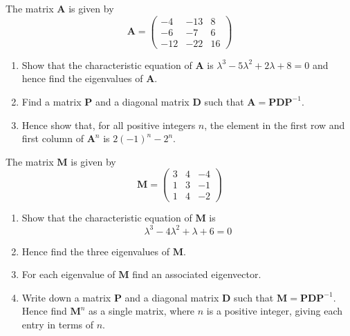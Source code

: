 \documentclass[leqno]{article}
\begin{document}
\begin{enumerate}[
  label=\textbf{\arabic*.},
  leftmargin=*,
  topsep=0pt,
  partopsep=0pt,
  parsep=0pt
]
\newpage

\questionitem

The matrix $\mathbf{A}$ is given by
\[\mathbf{A} = \begin{pmatrix} -4 & -13 & 8 \\ -6 & -7 & 6 \\ -12 & -22 & 16 \end{pmatrix}\]
\begin{enumerate}[label=\textbf{(\alph*)}]
  \item Show that the characteristic equation of $\mathbf{A}$ is $\lambda^3 - 5\lambda^2 + 2\lambda + 8 = 0$ and hence find the eigenvalues of $\mathbf{A}$.  \\
  \item Find a matrix $\mathbf{P}$ and a diagonal matrix $\mathbf{D}$ such that $\mathbf{A} = \mathbf{P}\mathbf{D}\mathbf{P}^{-1}$.  \\
  \item Hence show that, for all positive integers $n$, the element in the first row and first column of $\mathbf{A}^n$ is $2(-1)^n - 2^n$.  \\
\end{enumerate}

\newpage

\questionitem

The matrix $\mathbf{M}$ is given by
\[\mathbf{M} = \begin{pmatrix} 3 & 4 & -4 \\ 1 & 3 & -1 \\ 1 & 4 & -2 \end{pmatrix}\]
\begin{enumerate}[label=\textbf{(\alph*)}]
  \item Show that the characteristic equation of $\mathbf{M}$ is
  \[\lambda^3 - 4\lambda^2 + \lambda + 6 = 0\] 
  \item Hence find the three eigenvalues of $\mathbf{M}$.  \\
  \item For each eigenvalue of $\mathbf{M}$ find an associated eigenvector.  \\
  \item Write down a matrix $\mathbf{P}$ and a diagonal matrix $\mathbf{D}$ such that $\mathbf{M} = \mathbf{P}\mathbf{D}\mathbf{P}^{-1}$. Hence find $\mathbf{M}^n$ as a single matrix, where $n$ is a positive integer, giving each entry in terms of $n$.  \\
\end{enumerate}


\end{enumerate}
\end{document}

